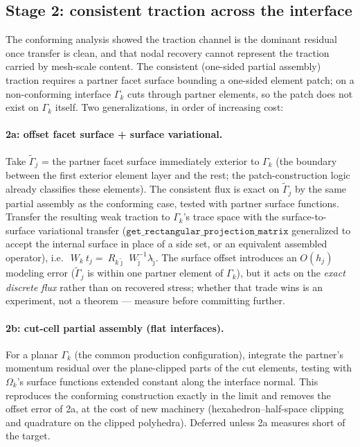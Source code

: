 \documentclass[11pt]{article}
\begin{document}
\subsection{Stage 2: consistent traction across the interface}

The conforming analysis showed the traction channel is the dominant
residual once transfer is clean, and that nodal recovery cannot
represent the traction carried by mesh-scale content.  The consistent
(one-sided partial assembly) traction requires a partner facet surface
bounding a one-sided element patch; on a non-conforming interface
$\Gamma_k$ cuts through partner elements, so the patch does not exist
on $\Gamma_k$ itself.  Two generalizations, in order of increasing
cost:

\paragraph{2a: offset facet surface + surface variational.}  Take
$\tilde\Gamma_j$ = the partner facet surface immediately exterior to
$\Gamma_k$ (the boundary between the first exterior element layer and
the rest; the patch-construction logic already classifies these
elements).  The consistent flux is exact on $\tilde\Gamma_j$ by the
same partial assembly as the conforming case, tested with partner
surface functions.  Transfer the resulting weak traction to
$\Gamma_k$'s trace space with the surface-to-surface variational transfer
($\texttt{get\_rectangular\_projection\_matrix}$ generalized to accept
the internal surface in place of a side set, or an equivalent
assembled operator), i.e.\
$~W_k \hat{~t}_j = ~R_{k\tilde\jmath}\, ~W_{\tilde\jmath}^{-1}
\lambda_{\tilde\jmath}$.
The surface offset introduces an $O(h_j)$ modeling error
($\tilde\Gamma_j$ is within one partner element of $\Gamma_k$), but it
acts on the \emph{exact discrete flux} rather than on recovered
stress; whether that trade wins is an experiment, not a theorem ---
measure before committing further.

\paragraph{2b: cut-cell partial assembly (flat interfaces).}  For a
planar $\Gamma_k$ (the common production configuration), integrate the
partner's momentum residual over the plane-clipped parts of the cut
elements, testing with $\Omega_k$'s surface functions extended
constant along the interface normal.  This reproduces the
conforming construction exactly in the limit and removes the offset
error of 2a, at the cost of new machinery (hexahedron--half-space
clipping and quadrature on the clipped polyhedra).  Deferred unless 2a
measures short of the target.
\end{document}
